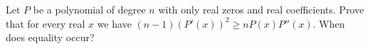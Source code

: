 Let $P$ be a polynomial of degree $n$ with only real zeros and real coefficients.
Prove that for every real $x$ we have $(n-1)(P'(x))^2\ge nP(x)P''(x)$. When does equality occur?